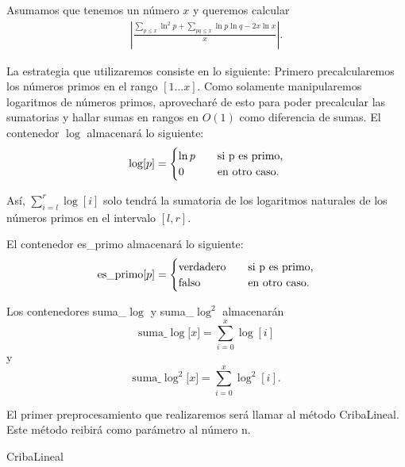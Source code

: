 \documentclass[10pt]{article}
\theoremstyle{definition}
\theoremstyle{remark}
\begin{document}
Asumamos que tenemos un n\'umero $x$ y queremos calcular
\begin{align}
\left|\frac{\sum_{p \leq x} \ln^2 p + \sum_{pq \leq x} \ln p \ln q - 2x\ln x}{x}\right|.
\end{align}

La estrategia que utilizaremos consiste en lo siguiente:
Primero precalcularemos los n\'umeros primos en el rango $[1 \dots x]$.
Como solamente manipularemos logaritmos de n\'umeros primos, aprovechar\'e de esto para poder precalcular
las sumatorias y hallar sumas en rangos en $O(1)$ como diferencia de sumas.
El contenedor $\log$ almacenar\'a lo siguiente:
\[
\log[p] =
\begin{cases}
\ln p &\quad\text{si }$p$\text{ es primo,}\\
0 &\quad\text{en otro caso.}
\end{cases}
\]

As\'i, $\sum_{i = l}^r \log[i]$ solo tendr\'a la sumatoria de
los logaritmos naturales de los n\'umeros primos en el intervalo $[l, r]$.

El contenedor es\_primo almacenar\'a lo siguiente:
\[
\text{es\_primo[$p$]} =
\begin{cases}
\text{verdadero} &\quad\text{si }$p$\text{ es primo,}\\
\text{falso} &\quad\text{en otro caso.}
\end{cases}
\]

Los contenedores suma\_$\log$ y suma\_$\log^2$ almacenar\'an
\[
\text{suma\_$\log$[$x$]} = \sum_{i = 0}^x \log[i]
\]
y
\[
\text{suma\_$\log^2$[$x$]} = \sum_{i = 0}^x \log^2[i].
\]

El primer preprocesamiento que realizaremos ser\'a llamar al m\'etodo CribaLineal.
Este m\'etodo reibir\'a como par\'ametro al n\'umero n. 

\begin{algorithm}[H]
\SetAlgoLined
\DontPrintSemicolon
{}
\caption{CribaLineal\label{CL}}
\end{algorithm}
\end{document}
